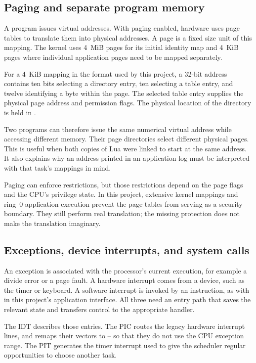 \documentclass[11pt,a4paper]{scrartcl}
\newcommand{\code}[1]{\texttt{\detokenize{#1}}}
\begin{document}
\subsection{Paging and separate program memory}

A program issues virtual addresses. With paging enabled, hardware uses
page tables to translate them into physical addresses. A page is a fixed
size unit of this mapping. The kernel uses 4~MiB pages for its initial
identity map and 4~KiB pages where individual application pages need to
be mapped separately.

For a 4~KiB mapping in the format used by this project, a 32-bit address
contains ten bits selecting a directory entry, ten selecting a table
entry, and twelve identifying a byte within the page. The selected table
entry supplies the physical page address and permission flags. The
physical location of the directory is held in \code{CR3}.

Two programs can therefore issue the same numerical virtual address while
accessing different memory. Their page directories select different
physical pages. This is useful when both copies of Lua were linked to
start at the same address. It also explains why an address printed in an
application log must be interpreted with that task's mappings in mind.

Paging can enforce restrictions, but those restrictions depend on the
page flags and the CPU's privilege state. In this project, extensive
kernel mappings and ring~0 application execution prevent the page tables
from serving as a security boundary. They still perform real translation;
the missing protection does not make the translation imaginary.

\subsection{Exceptions, device interrupts, and system calls}

An exception is associated with the processor's current execution, for
example a divide error or a page fault. A hardware interrupt comes from
a device, such as the timer or keyboard. A software interrupt is invoked
by an instruction, as with \code{int 0x80} in this project's application
interface. All three need an entry path that saves the relevant state
and transfers control to the appropriate handler.

The IDT describes those entries. The PIC routes the legacy hardware
interrupt lines, and \code{mboot} remaps their vectors to
\code{0x20}--\code{0x2F} so that they do not use the CPU exception range.
The PIT generates the timer interrupt used to give the scheduler regular
opportunities to choose another task.
\end{document}
